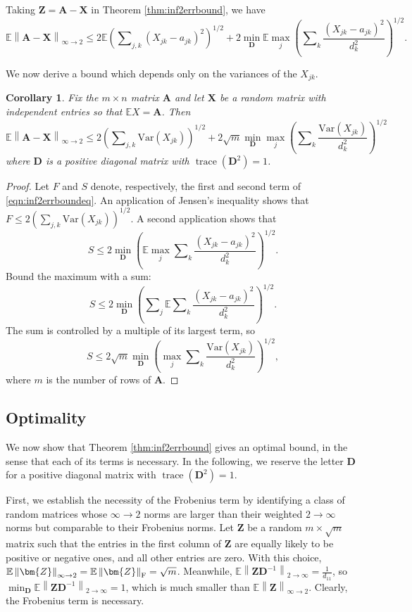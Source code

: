 \documentclass[11pt,letterpaper,twoside,reqno]{amsart}
\newcommand{\mat}[1]{\ensuremath{\bm{#1}}}
\newcommand{\E}{\ensuremath{\mathbb{E}}}
\newcommand{\inftnorm}[1]{\ensuremath{\left\|#1\right\|_{\infty\rightarrow 2}}}
\newcommand{\twoinfnorm}[1]{\ensuremath{\left\|#1\right\|_{2 \rightarrow \infty}}}
\newcommand{\inftwo}{\ensuremath{\infty\!\rightarrow\!\!2}}
\newcommand{\twoinf}{\ensuremath{2\!\!\rightarrow\!\!\infty}}
\newcommand{\frobnorm}[1]{\ensuremath{\left\|#1\right\|_{\text{\rm F}}}}
\newcommand{\var}[1]{\ensuremath{\mathrm{Var}(#1)}}
\DeclareMathOperator{\trace}{trace}
\newtheorem{cor}{Corollary}
\begin{document}
Taking $\mat{Z}=\mat{A}-\mat{X}$ in Theorem \ref{thm:inf2errbound}, we have  
\begin{equation}
\E\inftnorm{\mat{A}-\mat{X}}\leq2\E\left(\sum\nolimits_{j,k}(X_{jk}-a_{jk})^{2}\right)^{1/2}+2\min_{\mat{D}}\E\max_{j}\left(\sum\nolimits_{k}\frac{(X_{jk}-a_{jk})^{2}}{d_{k}^{2}}\right)^{1/2}.
\label{eqn:inf2errboundeq}
\end{equation}

We now derive a bound which depends only on the variances of the $X_{jk}$.
\begin{cor}
Fix the $m\times n$ matrix $\mat{A}$ and let $\mat{X}$ be a random matrix with independent entries so that $\E X=\mat{A}$. Then
\[
\E\inftnorm{\mat{A}-\mat{X}}\leq2\left(\sum\nolimits_{j,k}\var{X_{jk}}\right)^{1/2}+2\sqrt{m}\min_{\mat{D}}\max_{j}\left(\sum\nolimits_{k}\frac{\var{X_{jk}}}{d_{k}^{2}}\right)^{1/2}
\]
where $\mat{D}$ is a positive diagonal matrix with $\trace(\mat{D}^{2})=1$.
\label{cor:inf2errbound}
\end{cor}

\begin{proof}
Let $F$ and $S$ denote, respectively, the first and second term of \eqref{eqn:inf2errboundeq}. An application of Jensen's inequality shows that $F \leq2\left(\sum\nolimits_{j,k}\var{X_{jk}}\right)^{1/2}$.
A second application shows that 
\[
S \leq2\min_{\mat{D}}\left(\E\max_{j}\sum\nolimits_{k}\frac{(X_{jk}-a_{jk})^{2}}{d_{k}^{2}}\right)^{1/2}.
\]
Bound the maximum with a sum: 
\[
S \leq2\min_{\mat{D}}\left(\sum\nolimits_{j}\E\sum\nolimits_{k}\frac{(X_{jk}-a_{jk})^{2}}{d_{k}^{2}}\right)^{1/2}.
\]
The sum is controlled by a multiple of its largest term, so
\[
S \leq2\sqrt{m}\min_{\mat{D}}\left(\max_{j}\sum\nolimits_{k}\frac{\var{X_{jk}}}{d_{k}^{2}}\right)^{1/2},
\]
where $m$ is the number of rows of $\mat{A}.$
\end{proof}

\subsection{Optimality}

We now show that Theorem \ref{thm:inf2errbound} gives an optimal bound, in the sense that each of its terms is necessary. In the following, we reserve the letter $\mat{D}$ for a positive diagonal matrix with $\trace(\mat{D}^{2})=1.$

First, we establish the necessity of the Frobenius term by identifying a class of random matrices whose $\inftwo$ norms are larger than their weighted $\twoinf$ norms but comparable to their Frobenius norms. Let $\mat{Z}$ be a random $m\times\sqrt{m}$ matrix such that the entries in the first column of $\mat{Z}$ are equally likely to be positive or negative ones, and all other entries are zero. With this choice, $\E\inftnorm{\mat{Z}}=\E\frobnorm{\mat{Z}}=\sqrt{m}$. Meanwhile, $\E\twoinfnorm{\mat{Z}\mat{D}^{-1}}=\tfrac{1}{d_{11}}$, so $\min_{\mat{D}}\E\twoinfnorm{\mat{Z}\mat{D}^{-1}}=1$, which is much smaller than $\E\inftnorm{\mat{Z}}$. Clearly, the Frobenius term is necessary. 
\end{document}
